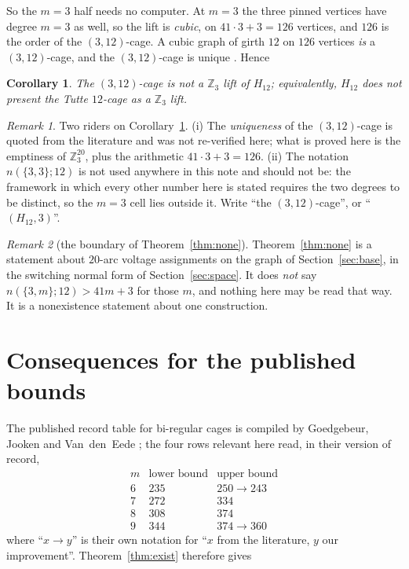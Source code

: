 \documentclass[11pt]{amsart}
\newtheorem{corollary}[theorem]{Corollary}
\theoremstyle{remark}
\newtheorem*{remark}{Remark}
\begin{document}
\noindent
So the $m=3$ half needs no computer. At $m=3$ the three pinned vertices have degree $m=3$ as
well, so the lift is \emph{cubic}, on $41\cdot3+3=126$ vertices, and $126$ is the order of the
$(3,12)$-cage. A cubic graph of girth $12$ on $126$ vertices \emph{is} a $(3,12)$-cage, and the
$(3,12)$-cage is unique \cite{DS16}. Hence

\begin{corollary}\label{cor:cage}
The $(3,12)$-cage is not a $\mathbb{Z}_3$ lift of $H_{12}$; equivalently, $H_{12}$ does not
present the Tutte $12$-cage \textup{\cite{Tutte}} as a $\mathbb{Z}_3$ lift.
\end{corollary}

\begin{remark}
Two riders on Corollary~\ref{cor:cage}. (i) The \emph{uniqueness} of the $(3,12)$-cage is
quoted from the literature \cite{DS16} and was not re-verified here; what is proved here is the
emptiness of $\mathbb{Z}_3^{20}$, plus the arithmetic $41\cdot 3+3=126$. (ii) The notation
$n(\{3,3\};12)$ is not used anywhere in this note and should not be: the framework in which
every other number here is stated requires the two degrees to be distinct, so the $m=3$ cell
lies outside it. Write ``the $(3,12)$-cage'', or ``$(H_{12},3)$''.
\end{remark}

\begin{remark}[the boundary of Theorem~\ref{thm:none}]
Theorem~\ref{thm:none} is a statement about $20$-arc voltage assignments on the graph of
Section~\ref{sec:base}, in the switching normal form of Section~\ref{sec:space}. It does
\emph{not} say $n(\{3,m\};12)>41m+3$ for those $m$, and nothing here may be read that way. It is
a nonexistence statement about one construction.
\end{remark}

\section{Consequences for the published bounds}\label{sec:record}

The published record table for bi-regular cages is compiled by Goedgebeur, Jooken and
Van~den~Eede \cite{GJV}; the four rows relevant here read, in their version of record,
\[
\begin{array}{c|r|r}
 m & \text{lower bound} & \text{upper bound}\\\hline
 6 & 235 & 250 \to 243\\
 7 & 272 & 334\\
 8 & 308 & 374\\
 9 & 344 & 374 \to 360
\end{array}
\]
where ``$x\to y$'' is their own notation for ``$x$ from the literature, $y$ our improvement''.
Theorem~\ref{thm:exist} therefore gives
\end{document}

